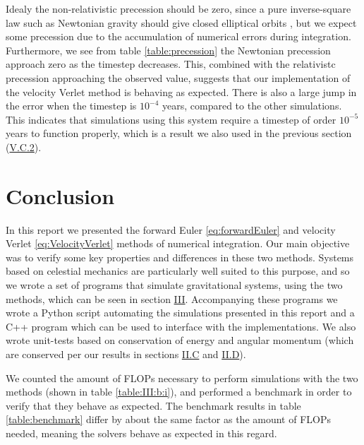 \documentclass[reprint,english,notitlepage]{revtex4-1}  %
\begin{document}
Idealy the non-relativistic precession should be zero, since a pure inverse-square law such as Newtonian gravity should give closed elliptical orbits \citep[p.~5]{Hjorth-Jensen2020}, but we expect some precession due to the accumulation of numerical errors during integration. Furthermore, we see from table \ref{table:precession} the Newtonian precession approach zero as the timestep decreases. This, combined with the relativistc precession approaching the observed value, suggests that our implementation of the velocity Verlet method is behaving as expected. There is also a large jump in the error when the timestep is $10^{-4}$ years, compared to the other simulations. This indicates that simulations using this system require a timestep of order $10^{-5}$ years to function properly, which is a result we also used in the previous section (\hyperref[sec:V:c:ii]{V.C.2}).



\newpage

\section{Conclusion} \label{sec:VI}


In this report we presented the forward Euler \eqref{eq:forwardEuler} and velocity Verlet \eqref{eq:VelocityVerlet} methods of numerical integration. Our main objective was to verify some key properties and differences in these two methods. Systems based on celestial mechanics are particularly well suited to this purpose, and so we wrote a set of programs that simulate gravitational systems, using the two methods, which can be seen in section \hyperref[sec:III]{III}. Accompanying these programs we wrote a Python script automating the simulations presented in this report and a C++ program which can be used to interface with the implementations. We also wrote unit-tests based on conservation of energy and angular momentum (which are conserved per our results in sections \hyperref[sec:II:c]{II.C} and \hyperref[sec:II:d]{II.D}). 

We counted the amount of FLOPs necessary to perform simulations with the two methods (shown in table \ref{table:III:b:i}), and performed a benchmark in order to verify that they behave as expected. The benchmark results in table \ref{table:benchmark} differ by about the same factor as the amount of FLOPs needed, meaning the solvers behave as expected in this regard. 
\end{document}
